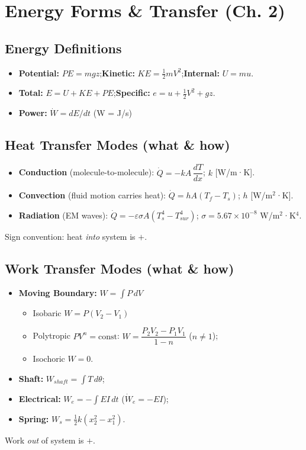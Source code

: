 \documentclass[10pt]{article}
\begin{document}
\section{Energy Forms \& Transfer (Ch. 2)}
\begin{multicols}{2}

\subsection*{Energy Definitions}
\begin{itemize}
    \item \textbf{Potential:} $PE = mgz$;\quad \textbf{Kinetic:} $KE=\tfrac12 mV^2$;\quad \textbf{Internal:} $U = m u$.
    \item \textbf{Total:} $E = U + KE + PE$;\quad \textbf{Specific:} $e = u + \tfrac12 V^2 + gz$.
    \item \textbf{Power:} $\dot W = dE/dt$ (W = J/s)
\end{itemize}

\subsection{Heat Transfer Modes (what \& how)}
\begin{itemize}
    \item \textbf{Conduction} (molecule-to-molecule): $\dot Q = -kA\,\dfrac{dT}{dx}$; $k$ [W/m·K].
    \item \textbf{Convection} (fluid motion carries heat): $\dot Q = hA(T_f - T_s)$; $h$ [W/m$^2$·K].
    \item \textbf{Radiation} (EM waves): $\dot Q = -\varepsilon\sigma A(T_s^4 - T_{sur}^4)$; $\sigma=5.67{\times}10^{-8}$ W/m$^2$·K$^4$.
\end{itemize}
Sign convention: heat \emph{into} system is $+$. \\

\subsection{Work Transfer Modes (what \& how)}
\begin{itemize}
    \item \textbf{Moving Boundary:} $W = \int P\,dV$
    \begin{itemize}
        \item Isobaric $W=P(V_2 - V_1)$
        \item Polytropic $PV^n=\text{const}$: $W=\dfrac{P_2V_2 - P_1V_1}{1-n}$ ($n\neq 1$);
        \item Isochoric $W=0$.
    \end{itemize}
    \item \textbf{Shaft:} $W_{shaft}=\int T\,d\theta$;
    \item \textbf{Electrical:} $W_e=-\int EI\,dt$ ($\dot W_e=-EI$);
    \item \textbf{Spring:} $W_s=\tfrac12 k(x_2^2 - x_1^2)$.
\end{itemize}
Work \emph{out} of system is $+$. \\


\end{multicols}
\end{document}
